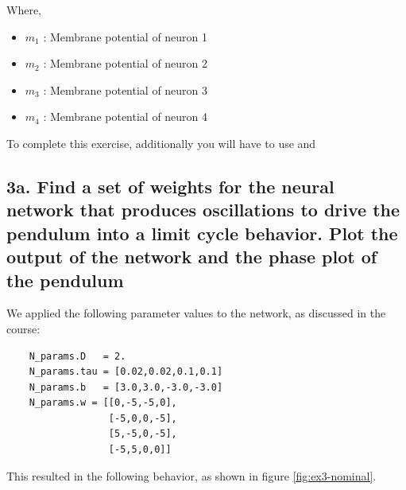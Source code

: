 \documentclass{cmc}
\begin{document}
Where,

\begin{itemize}
\item $m_1$ : Membrane potential of neuron 1
\item $m_2$ : Membrane potential of neuron 2
\item $m_3$ : Membrane potential of neuron 3
\item $m_4$ : Membrane potential of neuron 4
\end{itemize}

To complete this exercise, additionally you will have to use
 and 

\subsection*{3a. Find a set of weights for the neural network that
  produces oscillations to drive the pendulum into a limit cycle
  behavior. Plot the output of the network and the phase plot of
the pendulum}
\label{sec:4a}
We applied the following parameter values to the network, as discussed in the course:
\begin{verbatim}
    N_params.D   = 2.
    N_params.tau = [0.02,0.02,0.1,0.1]
    N_params.b   = [3.0,3.0,-3.0,-3.0]
    N_params.w = [[0,-5,-5,0],
                  [-5,0,0,-5],
                  [5,-5,0,-5],
                  [-5,5,0,0]] 
\end{verbatim}
This resulted in the following behavior, as shown in figure \ref{fig:ex3-nominal}.
\end{document}
